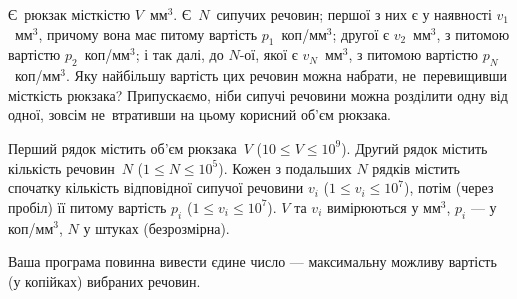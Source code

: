 ﻿Є~рюкзак місткістю $V$~мм$^3$.
Є~$N$~сипучих речовин;
першої з них є у наявності $v_1$~мм$^3$, причому вона має питому вартість $p_1$~{коп}/{мм$^3$};
другої є $v_2$~мм$^3$, з питомою вартістю $p_2$~{коп}/{мм$^3$};
і так далі, до {$N$-ої},
якої є $v_N$~мм$^3$, з питомою вартістю $p_N$~{коп}/{мм$^3$}.
Яку найбільшу вартість цих речовин можна набрати, не~перевищивши місткість рюкзака?
Припускаємо, ніби сипучі речовини можна розділити одну від одної, зовсім не~втративши на цьому корисний об'єм рюкзака.


\InputFile
Перший рядок містить об'єм рюкзака~$V$ ($10\leqslant V\leqslant 10^9$).
Др{\it у}гий рядок містить кількість речовин~$N$ ($1\leqslant N\leqslant 10^5$).
Кожен з подальших $N$ рядків містить спочатку кількість відповідної сипучої речовини $v_i$ ($1\leqslant v_i\leqslant 10^7$), потім (через пробіл) її питому вартість $p_i$ ($1\leqslant v_i\leqslant 10^7$).
$V$ та $v_i$ вимірюються у мм$^3$,
$p_i$ --- у {коп}/{мм$^3$},
$N$ у штуках (безрозмірна).


\OutputFile
Ваша програма повинна вивести єдине число --- максимальну можливу вартість (у копійках) вибраних речовин.

\Example

\begin{example}
%
\end{example}
